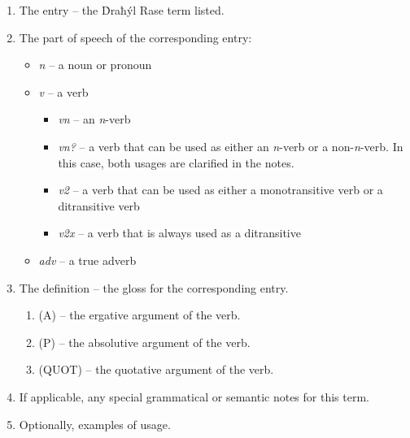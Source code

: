\documentclass{book}
\begin{document}
\begin{enumerate}
    \item The entry -- the Ḋraħýl Rase term listed.
    \item The part of speech of the corresponding entry:
    \begin{itemize}
        \item \textit{n} -- a noun or pronoun
        \item \textit{v} -- a verb
        \begin{itemize}
            \item \textit{vn} -- an \emph{n}-verb
            \item \textit{vn?} -- a verb that can be used as either an \emph{n}-verb or a non-\emph{n}-verb. In this case, both usages are clarified in the notes.
            \item \textit{v2} -- a verb that can be used as either a monotransitive verb or a ditransitive verb
            \item \textit{v2x} -- a verb that is always used as a ditransitive
        \end{itemize}
        \item \textit{adv} -- a true adverb
    \end{itemize}
    \item The definition -- the gloss for the corresponding entry.
    \begin{enumerate}
        \item (A) -- the ergative argument of the verb.
        \item (P) -- the absolutive argument of the verb.
        \item (QUOT) -- the quotative argument of the verb.
    \end{enumerate}
    \item If applicable, any special grammatical or semantic notes for this term.
    \item Optionally, examples of usage.
\end{enumerate}

\begin{multicols}{2}
    
\end{multicols}
\end{document}
